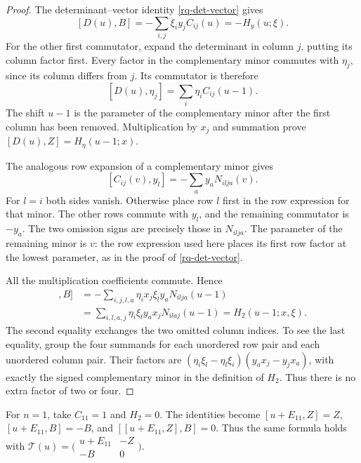 \begin{proof}
The determinant--vector identity \eqref{rq-det-vector} gives
\[
 [D(u),B]=-
       \sum_{i,j}\xi_i y_jC_{ij}(u)=-H_y(u;\xi).
\]
For the other first commutator, expand the determinant in column $j$,
putting its column factor first.  Every factor in the complementary
minor commutes with $\eta_j$, since its column differs from $j$.
Its commutator is therefore
\[
 [D(u),\eta_j]=\sum_i\eta_i C_{ij}(u-1).
\]
The shift $u-1$ is the parameter of the complementary minor after
the first column has been removed.  Multiplication by $x_j$ and
summation prove $[D(u),Z]=H_\eta(u-1;x)$.

The analogous row expansion of a complementary minor gives
\begin{equation}\label{cm-cofactor-vector}
 [C_{ij}(v),y_l]=-
                \sum_a y_aN_{ilja}(v).
\end{equation}
For $l=i$ both sides vanish.  Otherwise place row $l$ first
in the row expression for that minor.  The other rows commute
with $y_l$, and the remaining commutator is $-y_a$.
The two omission signs are precisely those in $N_{ilja}$.
The parameter of the remaining minor is $v$: the row expression
used here places its first row factor at the lowest parameter,
as in the proof of \eqref{rq-det-vector}.

All the multiplication coefficients commute.  Hence
\begin{align*}
 [[D(u),Z],B]
 &=-\sum_{i,j,l,a}\eta_i x_j\xi_l y_aN_{ilja}(u-1)\\
 &=\sum_{i,l,a,j}\eta_i\xi_l y_a x_jN_{ilaj}(u-1)
   =H_2(u-1;x,\xi).
\end{align*}
The second equality exchanges the two omitted column indices.
To see the last equality, group the four summands for each
unordered row pair and each unordered column pair.  Their factors
are $(\eta_i\xi_l-\eta_l\xi_i)(y_a x_j-y_jx_a)$, with exactly
the signed complementary minor in the definition of $H_2$.
Thus there is no extra factor of two or four.
\end{proof}

\begin{remark}\label{cm-small-dimension}
For $n=1$, take $C_{11}=1$ and $H_2=0$.  The identities become
$[u+E_{11},Z]=Z$, $[u+E_{11},B]=-B$, and
$[[u+E_{11},Z],B]=0$.  Thus the same formula holds with
$\mathcal T(u)=\bigl(\begin{smallmatrix}u+E_{11}&-Z\\-B&0
\end{smallmatrix}\bigr)$.
\end{remark}

